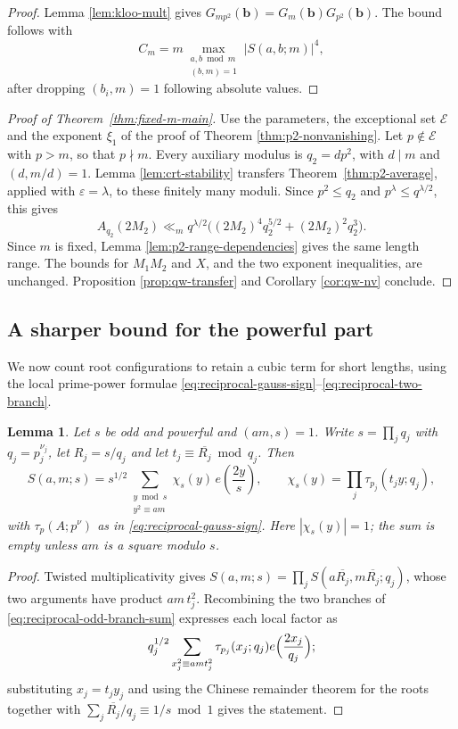 \documentclass[12pt, a4paper]{amsart}
\numberwithin{equation}{section}
\newcommand{\e}{e}
\newcommand{\ep}{\varepsilon}
\renewcommand{\le}{\leqslant}
\theoremstyle{plain}
\newtheorem{lem}{Lemma}[section]
\begin{document}
\begin{proof}
Lemma \ref{lem:kloo-mult} gives $G_{mp^2}(\mathbf b)=G_m(\mathbf b)G_{p^2}(\mathbf b)$. The bound follows with
$$
C_m=m\max_{\substack{a,b\bmod m\\ (b,m)=1}}|S(a,b;m)|^4,
$$
after dropping $(b_i,m)=1$ following absolute values.
\end{proof}

\begin{proof}[Proof of Theorem~\ref{thm:fixed-m-main}]
Use the parameters, the exceptional set $\mathcal E$ and the exponent $\xi_1$ of the proof of Theorem \ref{thm:p2-nonvanishing}. Let $p\notin\mathcal E$ with $p>m$, so that $p\nmid m$. Every auxiliary modulus is $q_2=dp^2$, with $d\mid m$ and $(d,m/d)=1$. Lemma \ref{lem:crt-stability} transfers Theorem~\ref{thm:p2-average}, applied with $\ep=\lambda$, to these finitely many moduli. Since $p^2\le q_2$ and $p^\lambda\le q^{\lambda/2}$, this gives
$$
A_{q_2}(2M_2)\ll_m q^{\lambda/2}
\bigl((2M_2)^4q_2^{5/2}+(2M_2)^2q_2^3\bigr).
$$
Since $m$ is fixed, Lemma \ref{lem:p2-range-dependencies} gives the same length range. The bounds for $M_1M_2$ and $X$, and the two exponent inequalities, are unchanged. Proposition \ref{prop:qw-transfer} and Corollary \ref{cor:qw-nv} conclude.
\end{proof}

\subsection{A sharper bound for the powerful part}
\label{sec:noloss}

We now count root configurations to retain a cubic term for short lengths, using the local prime-power formulae \eqref{eq:reciprocal-gauss-sign}--\eqref{eq:reciprocal-two-branch}.

\begin{lem}\label{lem:global-root}
Let $s$ be odd and powerful and $(am,s)=1$. Write $s=\prod_jq_j$ with $q_j=p_j^{\nu_j}$, let $R_j=s/q_j$ and let $t_j\equiv\overline{R_j}\bmod{q_j}$. Then
$$
S(a,m;s)=s^{1/2}\sum_{\substack{y\bmod s\\ y^2\equiv am}}\chi_s(y)\,\e\left(\frac{2y}{s}\right),
\qquad
\chi_s(y)=\prod_j\tau_{p_j}(t_jy;q_j),
$$
with $\tau_p(A;p^\nu)$ as in \eqref{eq:reciprocal-gauss-sign}. Here $|\chi_s(y)|=1$; the sum is empty unless $am$ is a square modulo $s$.
\end{lem}

\begin{proof}
 Twisted multiplicativity gives $S(a,m;s)=\prod_jS(a\overline{R_j},m\overline{R_j};q_j)$, whose two arguments have product $am\,t_j^2$. Recombining the two branches of \eqref{eq:reciprocal-odd-branch-sum} expresses each local factor as
$$
q_j^{1/2}\sum_{x_j^2\equiv am t_j^2}\tau_{p_j}(x_j;q_j)\e\Bigl(\frac{2x_j}{q_j}\Bigr);
$$
substituting $x_j=t_jy_j$ and using the Chinese remainder theorem for the roots together with $\sum_j\overline{R_j}/q_j\equiv1/s\bmod1$ gives the statement.
\end{proof}
\end{document}
